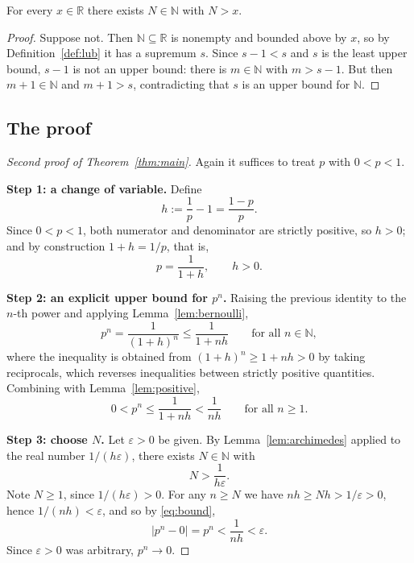 \documentclass{essay}
\begin{document}
\begin{lemma}\label{lem:archimedes}
For every $x \in \mathbb{R}$ there exists $N \in \mathbb{N}$ with $N > x$.
\end{lemma}

\begin{proof}
Suppose not. Then $\mathbb{N} \subseteq \mathbb{R}$ is nonempty and bounded above by
$x$, so by Definition~\ref{def:lub} it has a supremum $s$. Since $s - 1 < s$ and $s$
is the least upper bound, $s - 1$ is not an upper bound: there is $m \in \mathbb{N}$
with $m > s - 1$. But then $m + 1 \in \mathbb{N}$ and $m + 1 > s$, contradicting
that $s$ is an upper bound for $\mathbb{N}$.
\end{proof}

\subsection{The proof}

\begin{proof}[Second proof of Theorem~\ref{thm:main}]
Again it suffices to treat $p$ with $0 < p < 1$.

\medskip
\noindent\textbf{Step 1: a change of variable.}
Define
\[
  h := \frac{1}{p} - 1 = \frac{1 - p}{p}.
\]
Since $0 < p < 1$, both numerator and denominator are strictly positive, so $h > 0$;
and by construction $1 + h = 1/p$, that is,
\[
  p = \frac{1}{1 + h}, \qquad h > 0.
\]

\medskip
\noindent\textbf{Step 2: an explicit upper bound for $p^{n}$.}
Raising the previous identity to the $n$-th power and applying
Lemma~\ref{lem:bernoulli},
\[
  p^{n} = \frac{1}{(1+h)^{n}} \leq \frac{1}{1 + nh}
  \qquad \text{for all } n \in \mathbb{N},
\]
where the inequality is obtained from $(1+h)^{n} \geq 1 + nh > 0$ by taking
reciprocals, which reverses inequalities between strictly positive quantities.
Combining with Lemma~\ref{lem:positive},
\begin{equation}\label{eq:bound}
  0 < p^{n} \leq \frac{1}{1 + nh} < \frac{1}{nh}
  \qquad \text{for all } n \geq 1 .
\end{equation}

\medskip
\noindent\textbf{Step 3: choose $N$.}
Let $\varepsilon > 0$ be given. By Lemma~\ref{lem:archimedes} applied to the real
number $1 / (h\varepsilon)$, there exists $N \in \mathbb{N}$ with
\[
  N > \frac{1}{h \varepsilon} .
\]
Note $N \geq 1$, since $1/(h\varepsilon) > 0$. For any $n \geq N$ we have
$nh \geq Nh > 1/\varepsilon > 0$, hence $1/(nh) < \varepsilon$, and so
by \eqref{eq:bound},
\[
  |p^{n} - 0| = p^{n} < \frac{1}{nh} < \varepsilon .
\]
Since $\varepsilon > 0$ was arbitrary, $p^{n} \to 0$.
\end{proof}
\end{document}
